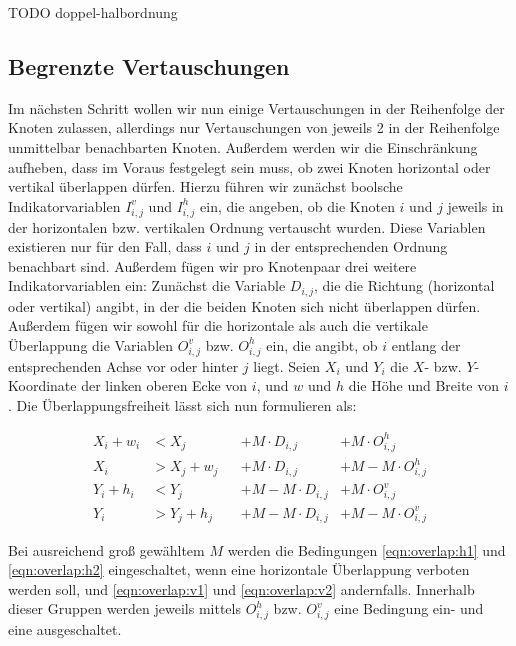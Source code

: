 TODO doppel-halbordnung

\subsection{Begrenzte Vertauschungen}

Im nächsten Schritt wollen wir nun einige Vertauschungen in der Reihenfolge der Knoten zulassen, allerdings nur Vertauschungen von jeweils 2 in der Reihenfolge unmittelbar benachbarten Knoten. Außerdem werden wir die Einschränkung aufheben, dass im Voraus festgelegt sein muss, ob zwei Knoten horizontal oder vertikal überlappen dürfen. Hierzu führen wir zunächst boolsche Indikatorvariablen $I^{v}_{i,j}$ und $I^{h}_{i,j}$ ein, die angeben, ob die Knoten $i$ und $j$ jeweils in der horizontalen bzw. vertikalen Ordnung vertauscht wurden. Diese Variablen existieren nur für den Fall, dass $i$ und $j$ in der entsprechenden Ordnung benachbart sind. Außerdem fügen wir pro Knotenpaar drei weitere Indikatorvariablen ein: Zunächst die Variable $D_{i,j}$, die die Richtung (horizontal oder vertikal) angibt, in der die beiden Knoten sich nicht überlappen dürfen. Außerdem fügen wir sowohl für die horizontale als auch die vertikale Überlappung die Variablen $O^{v}_{i,j}$ bzw. $O^{h}_{i,j}$ ein, die angibt, ob $i$ entlang der entsprechenden Achse vor oder hinter $j$ liegt. Seien $X_i$ und $Y_i$ die $X$- bzw. $Y$-Koordinate der linken oberen Ecke von $i$, und $w$ und $h$ die Höhe und Breite von $i$. Die Überlappungsfreiheit lässt sich nun formulieren als:

\begin{align}
	X_i + w_i &< X_j &&+ M \cdot D_{i,j} &+ M \cdot O^{h}_{i,j} \label{eqn:overlap:h1}\\
	X_i &> X_j + w_j &&+ M \cdot D_{i,j} &+ M - M \cdot O^{h}_{i,j} \label{eqn:overlap:h2}\\
	Y_i + h_i &< Y_j &&+ M - M \cdot D_{i,j} &+ M \cdot O^{v}_{i,j} \label{eqn:overlap:v1}\\
	Y_i &> Y_j + h_j &&+ M - M \cdot D_{i,j} &+ M - M \cdot O^{v}_{i,j} \label{eqn:overlap:v2}
\end{align}

Bei ausreichend groß gewähltem $M$ werden die Bedingungen \ref{eqn:overlap:h1} und \ref{eqn:overlap:h2} eingeschaltet, wenn eine horizontale Überlappung verboten werden soll, und \ref{eqn:overlap:v1} und \ref{eqn:overlap:v2} andernfalls. Innerhalb dieser Gruppen werden jeweils mittels $O^{h}_{i,j}$ bzw. $O^{v}_{i,j}$ eine Bedingung ein- und eine ausgeschaltet.
